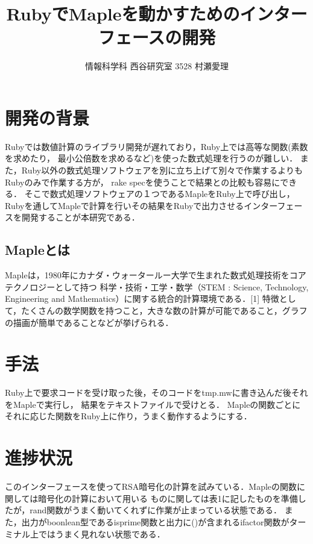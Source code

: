 \documentclass[10pt,a4j,twocolumn]{jsarticle}
\begin{document}
\title{RubyでMapleを動かすためのインターフェースの開発}
\author{情報科学科 西谷研究室 3528 村瀬愛理}
\date{}
\maketitle
\section{開発の背景}
Rubyでは数値計算のライブラリ開発が遅れており，Ruby上では高等な関数(素数を求めたり，
最小公倍数を求めるなど)を使った数式処理を行うのが難しい．
また，Ruby以外の数式処理ソフトウェアを別に立ち上げて別々で作業するよりもRubyのみで作業する方が，
rake specを使うことで結果との比較も容易にできる．
そこで数式処理ソフトウェアの１つであるMapleをRuby上で呼び出し，
Rubyを通してMapleで計算を行いその結果をRubyで出力させるインターフェースを開発することが本研究である．

\subsection{Mapleとは}
Mapleは，1980年にカナダ・ウォータールー大学で生まれた数式処理技術をコアテクノロジーとして持つ
科学・技術・工学・数学（STEM : Science, Technology, Engineering and Mathematics）に関する統合的計算環境である．[1]
特徴として，たくさんの数学関数を持つこと，大きな数の計算が可能であること，グラフの描画が簡単であることなどが挙げられる．

\section{手法}
Ruby上で要求コードを受け取った後，そのコードをtmp.mwに書き込んだ後それをMapleで実行し，
結果をテキストファイルで受けとる．
Mapleの関数ごとにそれに応じた関数をRuby上に作り，うまく動作するようにする．

\section{進捗状況}
このインターフェースを使ってRSA暗号化の計算を試みている．Mapleの関数に関しては暗号化の計算において用いる
ものに関しては表1に記したものを準備したが，rand関数がうまく動いてくれずに作業が止まっている状態である．
また，出力がboonlean型であるisprime関数と出力に()が含まれるifactor関数がターミナル上ではうまく見れない状態である．
\end{document}
